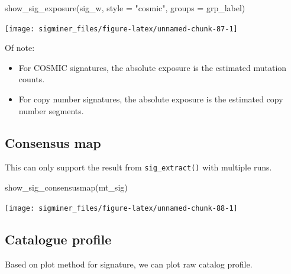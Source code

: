 \documentclass[
  12pt,
  a4paper,
  twoside]{book}
\newenvironment{Shaded}{\begin{snugshade}}{\end{snugshade}}
\newcommand{\AttributeTok}[1]{\textcolor[rgb]{0.77,0.63,0.00}{#1}}
\newcommand{\DecValTok}[1]{\textcolor[rgb]{0.00,0.00,0.81}{#1}}
\newcommand{\FunctionTok}[1]{\textcolor[rgb]{0.00,0.00,0.00}{#1}}
\newcommand{\NormalTok}[1]{#1}
\newcommand{\SpecialCharTok}[1]{\textcolor[rgb]{0.00,0.00,0.00}{#1}}
\newcommand{\StringTok}[1]{\textcolor[rgb]{0.31,0.60,0.02}{#1}}
\providecommand{\tightlist}{%
  \setlength{\itemsep}{0pt}\setlength{\parskip}{0pt}}
\begin{document}
\begin{Shaded}
\begin{Highlighting}[]
\FunctionTok{show\_sig\_exposure}\NormalTok{(sig\_w, }\AttributeTok{style =} \StringTok{"cosmic"}\NormalTok{, }\AttributeTok{groups =}\NormalTok{ grp\_label)}
\end{Highlighting}
\end{Shaded}

\texttt{[image: sigminer\_files/figure-latex/unnamed-chunk-87-1]}

Of note:

\begin{itemize}
\tightlist
\item
  For COSMIC signatures, the absolute exposure is the estimated mutation counts.
\item
  For copy number signatures, the absolute exposure is the estimated copy number segments.
\end{itemize}

\hypertarget{consensus-map}{%
\subsection{Consensus map}\label{consensus-map}}

This can only support the result from \texttt{sig\_extract()} with multiple runs.

\begin{Shaded}
\begin{Highlighting}[]
\FunctionTok{show\_sig\_consensusmap}\NormalTok{(mt\_sig)}
\end{Highlighting}
\end{Shaded}

\texttt{[image: sigminer\_files/figure-latex/unnamed-chunk-88-1]}

\hypertarget{catalogue-profile}{%
\subsection{Catalogue profile}\label{catalogue-profile}}

Based on plot method for signature, we can plot raw catalog profile.

\begin{Shaded}
\end{Shaded}
\end{document}
